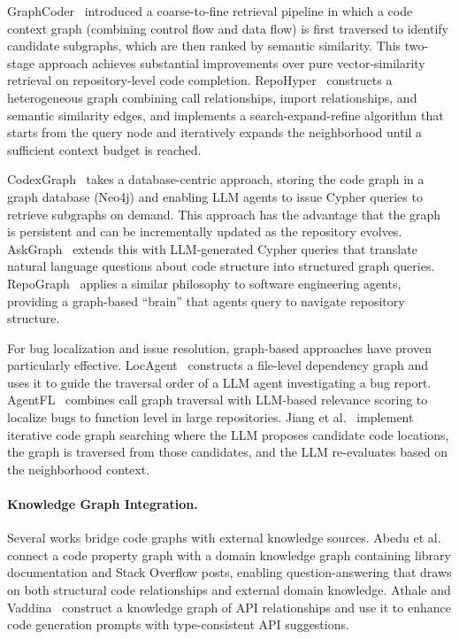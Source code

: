 GraphCoder~\cite{liu2024graphcoder} introduced a coarse-to-fine retrieval pipeline in which
a code context graph (combining control flow and data flow) is first traversed to identify
candidate subgraphs, which are then ranked by semantic similarity. This two-stage approach
achieves substantial improvements over pure vector-similarity retrieval on repository-level
code completion. RepoHyper~\cite{phan2025repohyper} constructs a heterogeneous graph
combining call relationships, import relationships, and semantic similarity edges, and
implements a search-expand-refine algorithm that starts from the query node and iteratively
expands the neighborhood until a sufficient context budget is reached.

CodexGraph~\cite{liu2025codexgraph} takes a database-centric approach, storing the code
graph in a graph database (Neo4j) and enabling LLM agents to issue Cypher queries to retrieve
subgraphs on demand. This approach has the advantage that the graph is persistent and can be
incrementally updated as the repository evolves. AskGraph~\cite{yang2025askgraph} extends this
with LLM-generated Cypher queries that translate natural language questions about code
structure into structured graph queries. RepoGraph~\cite{ouyang2025repograph} applies a
similar philosophy to software engineering agents, providing a graph-based ``brain'' that
agents query to navigate repository structure.

For bug localization and issue resolution, graph-based approaches have proven particularly
effective. LocAgent~\cite{chen2025locagent} constructs a file-level dependency graph and uses
it to guide the traversal order of a LLM agent investigating a bug report. AgentFL~\cite{qin2025agentfl}
combines call graph traversal with LLM-based relevance scoring to localize bugs to function
level in large repositories. Jiang et al.~\cite{jiang2025issue} implement iterative code graph
searching where the LLM proposes candidate code locations, the graph is traversed from those
candidates, and the LLM re-evaluates based on the neighborhood context.

\paragraph{Knowledge Graph Integration.}
Several works bridge code graphs with external knowledge sources. Abedu et
al.~\cite{abedu2026synergizing} connect a code property graph with a domain knowledge graph
containing library documentation and Stack Overflow posts, enabling question-answering that
draws on both structural code relationships and external domain knowledge. Athale and
Vaddina~\cite{athale2025knowledgegraph} construct a knowledge graph of API relationships and
use it to enhance code generation prompts with type-consistent API suggestions.

